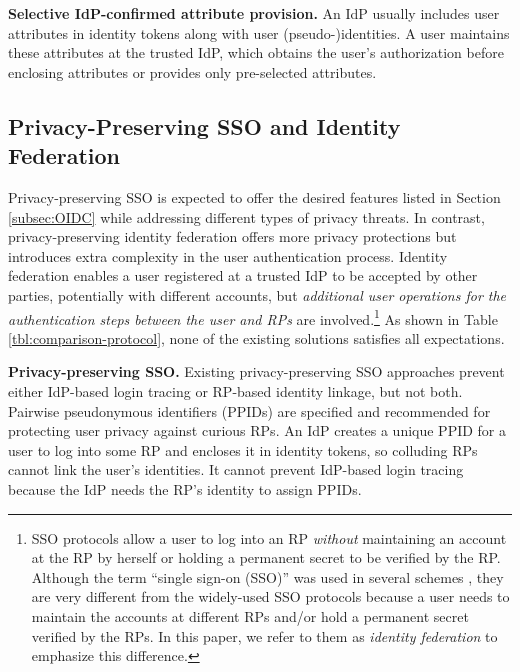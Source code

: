 \noindent\textbf{Selective IdP-confirmed attribute provision.}
An IdP usually includes user attributes in identity tokens \cite{OpenIDConnect,rfc6749} along with user (pseudo-)identities.
A user maintains these attributes at the trusted IdP,
which obtains the user's authorization before enclosing attributes or provides only pre-selected attributes.

\subsection{Privacy-Preserving SSO and Identity Federation}
\label{subsec-solutions}

\newc
Privacy-preserving SSO is expected to offer the desired features listed in Section \ref{subsec:OIDC} while addressing different types of privacy threats.
In contrast, privacy-preserving identity federation offers more privacy protections but introduces extra complexity in the user authentication process.
Identity federation enables a user registered at a trusted IdP to be accepted by other parties, potentially with different accounts,
but \emph{additional user operations for the authentication steps between the user and RPs} are involved.\footnote{\newc SSO protocols \cite{OpenIDConnect,rfc6749, SAML, SAMLIdentifier} allow a user to log into an RP \emph{without} maintaining an account at the RP by herself or holding a permanent secret to be verified by the RP. Although the term ``single sign-on (SSO)'' was used in several schemes \cite{PseudoID, Opaak, ELPASSO, WangWS13, HanCSTW18, HanCSTWW20}, they are very different from the widely-used SSO protocols because a user needs to maintain the accounts at different RPs and/or hold a permanent secret verified by the RPs. In this paper, we refer to them as \emph{identity federation} to emphasize this difference.}
As shown in Table \ref{tbl:comparison-protocol}, none of the existing solutions satisfies all expectations.


\noindent\textbf{Privacy-preserving SSO.}
Existing privacy-preserving SSO approaches \cite{BrowserID, SPRESSO, NIST2017draft} prevent either IdP-based login tracing or RP-based identity linkage, but not both.
\oldc
Pairwise pseudonymous identifiers (PPIDs) are specified \cite{OpenIDConnect, SAMLIdentifier} and recommended \cite{NIST2017draft}
for protecting user privacy against curious RPs.
An IdP creates a unique PPID for a user to log into some RP and encloses it in identity tokens, so colluding RPs cannot link the user's identities.
It cannot prevent IdP-based login tracing because the IdP needs the RP's identity to assign PPIDs.

